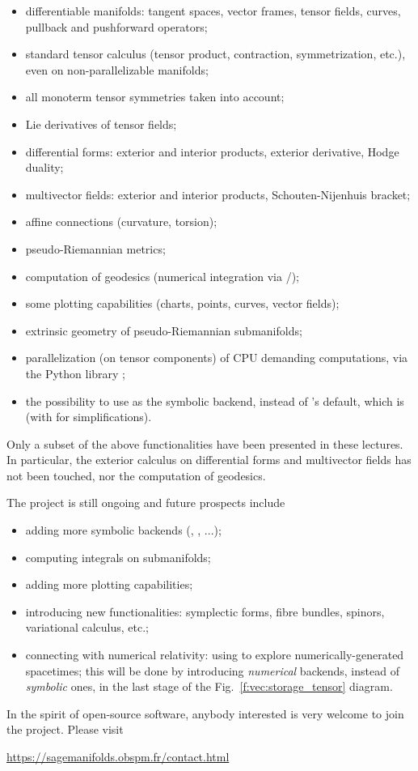 \begin{itemize}
\item differentiable manifolds: tangent spaces, vector frames, tensor fields, curves, pullback and pushforward operators;
\item standard tensor calculus (tensor product, contraction, symmetrization, etc.), even on non-parallelizable manifolds;
\item all monoterm tensor symmetries taken into account;
\item Lie derivatives of tensor fields;
\item differential forms: exterior and interior products, exterior derivative,
Hodge duality;
\item multivector fields: exterior and interior products, Schouten-Nijenhuis bracket;
\item affine connections (curvature, torsion);
\item pseudo-Riemannian metrics;
\item computation of geodesics (numerical integration via \Sage{}/);
\item some plotting capabilities (charts, points, curves, vector fields);
\item extrinsic geometry of pseudo-Riemannian submanifolds;
\item parallelization (on tensor components) of CPU demanding computations,
via the Python library ;
\item the possibility to use  as the symbolic backend, instead of
\Sage{}'s default, which is  (with  for simplifications).
\end{itemize}
Only a subset of the above functionalities have been presented in these lectures.
In particular,
the exterior calculus on differential forms and multivector fields has not been
touched, nor the computation of geodesics.

\medskip

The  project is still ongoing and future prospects include
\begin{itemize}
\item adding more symbolic backends (, , ...);
\item computing integrals on submanifolds;
\item adding more plotting capabilities;
\item introducing new functionalities: symplectic forms, fibre bundles,
spinors, variational calculus, etc.;
\item connecting with numerical relativity: using \Sage{} to explore
numerically-generated spacetimes; this will be done by introducing
\emph{numerical} backends, instead
of \emph{symbolic} ones, in the last stage of the Fig.~\ref{f:vec:storage_tensor}
diagram.
\end{itemize}
In the spirit of open-source software, anybody interested is very welcome
to join the project. Please visit
\begin{center}
\url{https://sagemanifolds.obspm.fr/contact.html}
\end{center}

